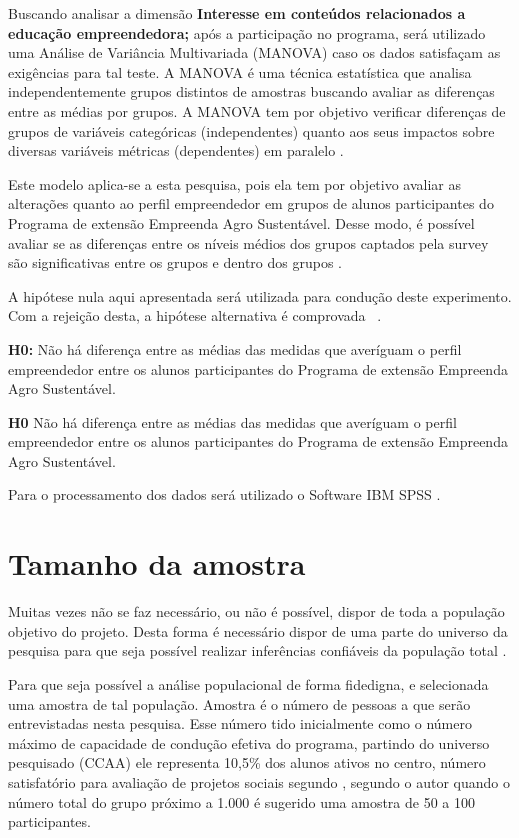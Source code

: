 Buscando analisar a dimensão \textbf{Interesse em conteúdos relacionados a educação empreendedora;} após a participação no programa, será utilizado uma Análise de Variância Multivariada (MANOVA) caso os dados satisfaçam as exigências para tal teste. A MANOVA é uma técnica estatística que analisa independentemente grupos distintos de amostras buscando avaliar as diferenças entre as médias por grupos. A MANOVA tem por objetivo verificar diferenças de grupos de variáveis categóricas (independentes) quanto aos seus impactos sobre diversas variáveis métricas (dependentes) em paralelo  \cite{hair_alise_2009}. 

Este modelo aplica-se a esta pesquisa, pois ela tem por objetivo avaliar as alterações quanto ao perfil empreendedor em grupos de alunos participantes do Programa de extensão Empreenda Agro Sustentável. Desse modo, é possível avaliar se as diferenças entre os níveis médios dos grupos captados pela \textit{}{survey} são significativas entre os grupos e dentro dos grupos \cite{rocha_avaliacao_2014}. 

A hipótese nula aqui apresentada será utilizada para condução deste experimento. Com a rejeição desta, a hipótese alternativa é comprovada \ \cite{hair_alise_2009}.

\textbf{H0:} Não há diferença entre as médias das medidas que averíguam o perfil empreendedor entre os alunos participantes do Programa de extensão Empreenda Agro Sustentável.

\textbf{H0} Não há diferença entre as médias das medidas que averíguam o perfil empreendedor entre os alunos participantes do Programa de extensão Empreenda Agro Sustentável.



Para o processamento dos dados será utilizado o Software IBM SPSS \cite{ibm_corp_ibm_2017}. 


\section{Tamanho da amostra}

Muitas  vezes  não  se  faz necessário,  ou não é possível, dispor de toda a população objetivo do projeto. Desta forma é necessário dispor de uma parte do universo da pesquisa para que seja possível realizar inferências confiáveis da população total \cite{marino_manual_2003}.

Para que seja possível a análise populacional de forma fidedigna, e selecionada uma amostra de tal população. Amostra é o número de pessoas a que serão entrevistadas nesta pesquisa. Esse número tido inicialmente como o número máximo de capacidade de condução efetiva do programa, partindo do universo pesquisado (CCAA) ele representa 10,5\% dos alunos ativos no centro, número satisfatório para avaliação de projetos sociais segundo , segundo o autor quando o número total do grupo próximo a 1.000 é sugerido uma amostra de 50 a 100 participantes. 

